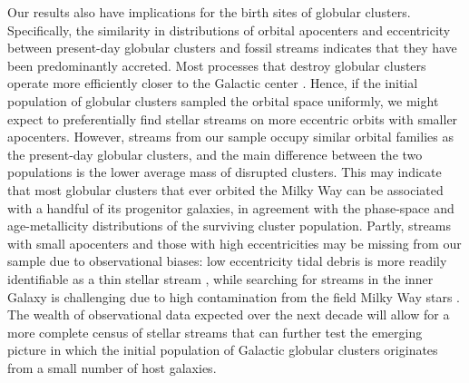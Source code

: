 \documentclass[twocolumn]{aastex63}
\begin{document}
Our results also have implications for the birth sites of globular clusters.
Specifically, the similarity in distributions of orbital apocenters and eccentricity between present-day globular clusters and fossil streams indicates that they have been predominantly accreted.
Most processes that destroy globular clusters operate more efficiently closer to the Galactic center \citep[e.g.,][]{gnedin:1997}.
Hence, if the initial population of globular clusters sampled the orbital space uniformly, we might expect to preferentially find stellar streams on more eccentric orbits with smaller apocenters.
However, streams from our sample occupy similar orbital families as the present-day globular clusters, and the main difference between the two populations is the lower average mass of disrupted clusters.
This may indicate that most globular clusters that ever orbited the Milky Way can be associated with a handful of its progenitor galaxies, in agreement with the phase-space \citep{massari:2019,trujillogomez20} and age-metallicity \citep{kruijssen19e,kruijssen20} distributions of the surviving cluster population.
Partly, streams with small apocenters and those with high eccentricities may be missing from our sample due to observational biases: low eccentricity tidal debris is more readily identifiable as a thin stellar stream \citep{hendel:2015}, while searching for streams in the inner Galaxy is challenging due to high contamination from the field Milky Way stars \citep[e.g.,][]{ibata:2019}.
The wealth of observational data expected over the next decade will allow for a more complete census of stellar streams that can further test the emerging picture in which the initial population of Galactic globular clusters originates from a small number of host galaxies.
\end{document}
